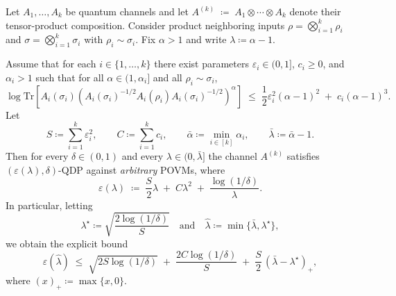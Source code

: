 \documentclass[10pt,a4paper]{amsart}
\def\Tr{\mathrm{Tr}}
\begin{document}
\begin{proposition}
\label{prop:thm1-from-qma}
Let $A_1,\ldots,A_k$ be quantum channels and let
$
A^{(k)} \;\coloneqq\; A_1\otimes\cdots\otimes A_k
$
denote their tensor-product composition. Consider product neighboring inputs
$\rho=\bigotimes_{i=1}^k \rho_i$ and $\sigma=\bigotimes_{i=1}^k \sigma_i$ with $\rho_i\sim\sigma_i$.
Fix $\alpha>1$ and write $\lambda\coloneqq\alpha-1$.

Assume that for each $i\in\{1,\ldots,k\}$ there exist parameters $\varepsilon_i\in(0,1]$,
$c_i\ge 0$, and $\alpha_i>1$ such that for all $\alpha\in(1,\alpha_i]$ and all $\rho_i\sim\sigma_i$,
\begin{equation}
\label{eq:qma-small-lambda-assumption}
\log \Tr\!\left[
A_i(\sigma_i)\left(A_i(\sigma_i)^{-1/2}A_i(\rho_i)A_i(\sigma_i)^{-1/2}\right)^{\alpha}
\right]
\;\le\;
\frac{1}{2}\varepsilon_i^2(\alpha-1)^2 \;+\; c_i(\alpha-1)^3.
\end{equation}
Let
\[
S \coloneqq \sum_{i=1}^k \varepsilon_i^2,
\qquad
C \coloneqq \sum_{i=1}^k c_i,
\qquad
\bar\alpha \coloneqq \min_{i\in[k]} \alpha_i,
\qquad
\bar\lambda \coloneqq \bar\alpha-1.
\]
Then for every $\delta\in(0,1)$ and every $\lambda\in(0,\bar\lambda]$ the channel $A^{(k)}$
satisfies $(\varepsilon(\lambda),\delta)$-QDP against \emph{arbitrary} POVMs, where
\begin{equation}
\label{eq:eps-lambda-updated}
\varepsilon(\lambda)
\;\coloneqq\;
\frac{S}{2}\lambda \;+\; C\lambda^2 \;+\; \frac{\log(1/\delta)}{\lambda}.
\end{equation}
In particular, letting
\[
\lambda^\star \coloneqq \sqrt{\frac{2\log(1/\delta)}{S}}
\quad\text{and}\quad
\hat\lambda \coloneqq \min\{\bar\lambda,\lambda^\star\},
\]
we obtain the explicit bound
\begin{equation}
\label{eq:eps-explicit-updated}
\varepsilon(\hat\lambda)
\;\le\;
\sqrt{2S\log(1/\delta)}
\;+\;
\frac{2C\log(1/\delta)}{S}
\;+\;
\frac{S}{2}\,(\bar\lambda-\lambda^\star)_+,
\end{equation}
where $(x)_+ \coloneqq \max\{x,0\}$.
\end{proposition}
\end{document}
